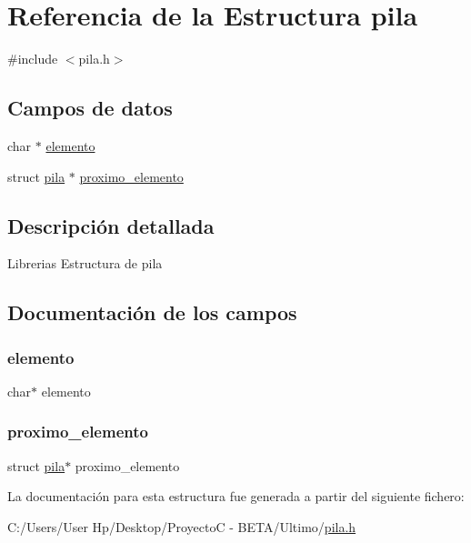 \hypertarget{structpila}{}\section{Referencia de la Estructura pila}
\label{structpila}


{\ttfamily \#include $<$pila.\+h$>$}

\subsection*{Campos de datos}
\begin{DoxyCompactItemize}
\item 
char $\ast$ \hyperlink{structpila_a631cf34474d00b9cb6bf64417c99033f}{elemento}
\item 
struct \hyperlink{structpila}{pila} $\ast$ \hyperlink{structpila_a34876762e0ba6bfdf95ba7fb3f3734d8}{proximo\+\_\+elemento}
\end{DoxyCompactItemize}


\subsection{Descripción detallada}
Librerias Estructura de pila 

\subsection{Documentación de los campos}
\hypertarget{structpila_a631cf34474d00b9cb6bf64417c99033f}{}\label{structpila_a631cf34474d00b9cb6bf64417c99033f} 
\subsubsection{\texorpdfstring{elemento}{elemento}}
{\footnotesize\ttfamily char$\ast$ elemento}

\hypertarget{structpila_a34876762e0ba6bfdf95ba7fb3f3734d8}{}\label{structpila_a34876762e0ba6bfdf95ba7fb3f3734d8} 
\subsubsection{\texorpdfstring{proximo\+\_\+elemento}{proximo\_elemento}}
{\footnotesize\ttfamily struct \hyperlink{structpila}{pila}$\ast$ proximo\+\_\+elemento}



La documentación para esta estructura fue generada a partir del siguiente fichero\+:\begin{DoxyCompactItemize}
\item 
C\+:/\+Users/\+User Hp/\+Desktop/\+Proyecto\+C -\/ B\+E\+T\+A/\+Ultimo/\hyperlink{pila_8h}{pila.\+h}\end{DoxyCompactItemize}
